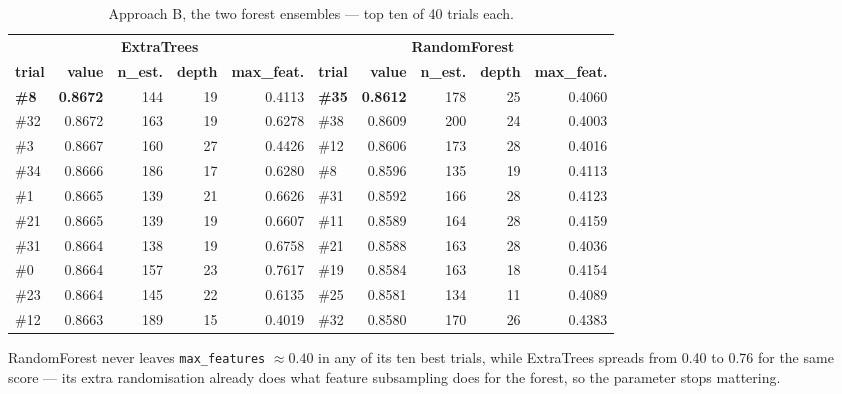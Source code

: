 \begin{table}[H]
\centering
\caption{Approach B, the two forest ensembles --- top ten of 40 trials each.}
\label{tab:app:optBforest}
\scriptsize
\begin{tabular}{@{}lrrrr@{}lrrrr@{}}
\toprule
\multicolumn{5}{c}{\textbf{ExtraTrees}} & \multicolumn{5}{c}{\textbf{RandomForest}} \\
\cmidrule(lr){1-5}\cmidrule(lr){6-10}
\textbf{trial} & \textbf{value} & \textbf{n\_est.} & \textbf{depth} &
\textbf{max\_feat.} &
\textbf{trial} & \textbf{value} & \textbf{n\_est.} & \textbf{depth} &
\textbf{max\_feat.} \\
\midrule
\textbf{\#8}  & \textbf{0.8672} & 144 & 19 & 0.4113 & \textbf{\#35} & \textbf{0.8612} & 178 & 25 & 0.4060 \\
\#32 & 0.8672 & 163 & 19 & 0.6278 & \#38 & 0.8609 & 200 & 24 & 0.4003 \\
\#3  & 0.8667 & 160 & 27 & 0.4426 & \#12 & 0.8606 & 173 & 28 & 0.4016 \\
\#34 & 0.8666 & 186 & 17 & 0.6280 & \#8  & 0.8596 & 135 & 19 & 0.4113 \\
\#1  & 0.8665 & 139 & 21 & 0.6626 & \#31 & 0.8592 & 166 & 28 & 0.4123 \\
\#21 & 0.8665 & 139 & 19 & 0.6607 & \#11 & 0.8589 & 164 & 28 & 0.4159 \\
\#31 & 0.8664 & 138 & 19 & 0.6758 & \#21 & 0.8588 & 163 & 28 & 0.4036 \\
\#0  & 0.8664 & 157 & 23 & 0.7617 & \#19 & 0.8584 & 163 & 18 & 0.4154 \\
\#23 & 0.8664 & 145 & 22 & 0.6135 & \#25 & 0.8581 & 134 & 11 & 0.4089 \\
\#12 & 0.8663 & 189 & 15 & 0.4019 & \#32 & 0.8580 & 170 & 26 & 0.4383 \\
\bottomrule
\end{tabular}
\end{table}

RandomForest never leaves \texttt{max\_features} $\approx\num{0.40}$ in any of its
ten best trials, while ExtraTrees spreads from \num{0.40} to \num{0.76} for the
same score --- its extra randomisation already does what feature subsampling does
for the forest, so the parameter stops mattering.

